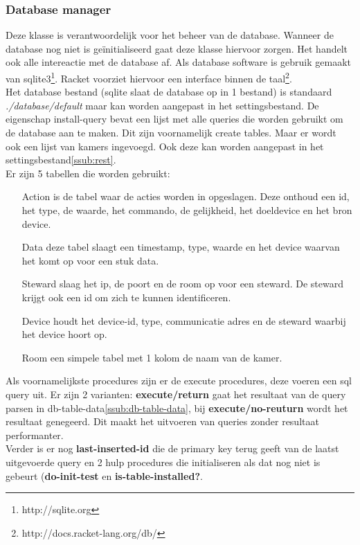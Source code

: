 \documentclass{article}
\begin{document}
\subsubsection{Database manager}
\label{ssub:database-manager}
Deze klasse is verantwoordelijk voor het beheer van de database. Wanneer de database nog niet is ge\"initialiseerd gaat deze klasse hiervoor zorgen. Het handelt ook alle intereactie met de database af. Als database software is gebruik gemaakt van sqlite3\footnote{http://sqlite.org}. Racket voorziet hiervoor een interface binnen de taal\footnote{http://docs.racket-lang.org/db/}.\\
Het database bestand (sqlite slaat de database op in 1 bestand) is standaard \emph{./database/default} maar kan worden aangepast in het settingsbestand. De eigenschap install-query bevat een lijst met alle queries die worden gebruikt om de database aan te maken. Dit zijn voornamelijk create tables. Maar er wordt ook een lijst van kamers ingevoegd. Ook deze kan worden aangepast in het settingsbestand\ref{ssub:rest}.\\
Er zijn 5 tabellen die worden gebruikt:
\begin{itemize}
\item[Action] is de tabel waar de acties worden in opgeslagen. Deze onthoud een id, het type, de waarde, het commando, de gelijkheid, het doeldevice en het bron device.
\item[Data] deze tabel slaagt een timestamp, type, waarde en het device waarvan het komt op voor een stuk data.
\item[Steward] slaag het ip, de poort en de room op voor een steward. De steward krijgt ook een id om zich te kunnen identificeren.
\item[Device] houdt het device-id, type, communicatie adres en de steward waarbij het device hoort op.
\item[Room] een simpele tabel met 1 kolom de naam van de kamer.
\end{itemize}
Als voornamelijkste procedures zijn er de execute procedures, deze voeren een sql query uit. Er zijn 2 varianten: \textbf{execute/return} gaat het resultaat van de query parsen in db-table-data\ref{ssub:db-table-data}, bij \textbf{execute/no-reuturn} wordt het resultaat genegeerd. Dit maakt het uitvoeren van queries zonder resultaat performanter.\\
Verder is er nog \textbf{last-inserted-id} die de primary key terug geeft van de laatst uitgevoerde query en 2 hulp procedures die initialiseren als dat nog niet is gebeurt (\textbf{do-init-test} en \textbf{is-table-installed?}.
\end{document}
